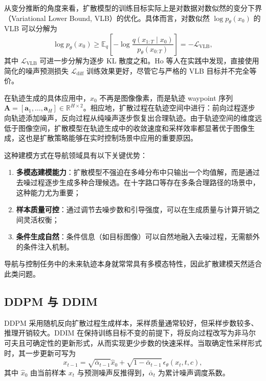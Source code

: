 从变分推断的角度来看，扩散模型的训练目标实际上是对数据对数似然的变分下界（Variational Lower Bound, VLB）的优化。具体而言，对数似然 $\log p_\theta(x_0)$ 的 VLB 可以分解为
\begin{equation}
\log p_\theta(x_0) \geq \mathbb{E}_q\!\left[-\log \frac{q(x_{1:T}\mid x_0)}{p_\theta(x_{0:T})}\right] = -\mathcal{L}_{\text{VLB}},
\end{equation}
其中 $\mathcal{L}_{\text{VLB}}$ 可进一步分解为逐步 KL 散度之和。Ho 等人\cite{ddpm2020}在实践中发现，直接使用简化的噪声预测损失 $\mathcal{L}_{\text{diff}}$ 训练效果更好，尽管它与严格的 VLB 目标并不完全等价。

在轨迹生成的具体应用中，$x_0$ 不再是图像像素，而是轨迹 waypoint 序列 $\mathbf{A} = [\mathbf{a}_1, \ldots, \mathbf{a}_H] \in \mathbb{R}^{H \times 2}$。相应地，扩散过程在轨迹空间中进行：前向过程逐步向轨迹添加噪声，反向过程从纯噪声逐步恢复出合理轨迹。由于轨迹空间的维度远低于图像空间，扩散模型在轨迹生成中的收敛速度和采样效率都显著优于图像生成，这也是扩散策略能够在实时控制场景中应用的重要原因。

这种建模方式在导航领域具有以下关键优势：
\begin{enumerate}
    \item \textbf{多模态建模能力}：扩散模型不强迫在多峰分布中只输出一个均值解，而是通过去噪过程逐步生成多种合理候选。在十字路口等存在多条合理路径的场景中，这种能力尤为重要；
    \item \textbf{样本质量可控}：通过调节去噪步数和引导强度，可以在生成质量与计算开销之间灵活权衡；
    \item \textbf{条件生成自然}：条件信息（如目标图像）可以自然地融入去噪过程，无需额外的条件注入机制。
\end{enumerate}
导航与控制任务中的未来轨迹本身就常常具有多模态特性，因此扩散建模天然适合此类问题。


\subsection{DDPM 与 DDIM}

DDPM 采用随机反向扩散过程生成样本，采样质量通常较好，但采样步数较多、推理开销较大\cite{ddpm2020}。DDIM 在保持训练目标不变的前提下，将反向过程改写为非马尔可夫且可确定性的更新形式，从而实现更少步数的快速采样\cite{ddim2020}。当取确定性采样形式时，其一步更新可写为
\begin{equation}
x_{t-1} = \sqrt{\bar\alpha_{t-1}}\hat x_0 + \sqrt{1-\bar\alpha_{t-1}}\,\epsilon_\theta(x_t,t,c),
\end{equation}
其中 $\hat x_0$ 由当前样本 $x_t$ 与预测噪声反推得到，$\bar\alpha_t$ 为累计噪声调度系数。

